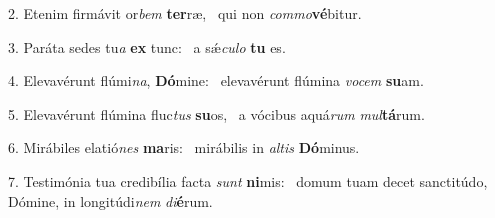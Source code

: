 2. Etenim firmávit or\textit{bem} \textbf{ter}ræ, \ast\  qui non \textit{com}\textit{mo}\textbf{vé}bitur.\

3. Paráta sedes tu\textit{a} \textbf{ex} tunc: \ast\  a sǽ\textit{cu}\textit{lo} \textbf{tu} es.\

4. Elevavérunt flúmi\textit{na}, \textbf{Dó}mine: \ast\  elevavérunt flúmina \textit{vo}\textit{cem} \textbf{su}am.\

5. Elevavérunt flúmina fluc\textit{tus} \textbf{su}os, \ast\  a vócibus aquá\textit{rum} \textit{mul}\textbf{tá}rum.\

6. Mirábiles elatió\textit{nes} \textbf{ma}ris: \ast\  mirábilis in \textit{al}\textit{tis} \textbf{Dó}minus.\

7. Testimónia tua credibília facta \textit{sunt} \textbf{ni}mis: \ast\  domum tuam decet sanctitúdo, Dómine, in longitúdi\textit{nem} \textit{di}\textbf{é}rum.\

